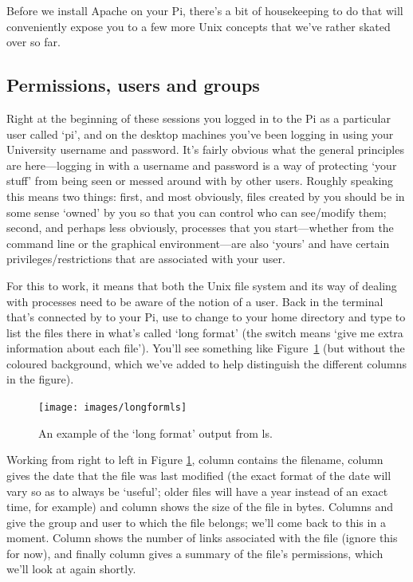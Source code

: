 Before we install Apache on your Pi, there's a bit of housekeeping to
do that will conveniently expose you to a few more Unix concepts that
we've rather skated over so far.

\subsection{Permissions, users and groups}

Right at the beginning of these sessions you logged in to the Pi as a
particular user called `pi', and on the desktop machines you've been
logging in using your University username and password. It's fairly
obvious what the general principles are here---logging in with a
username and password is a way of protecting `your stuff' from being
seen or messed around with by other users. Roughly speaking this means
two things: first, and most obviously, files created by you should be
in some sense `owned' by you so that you can control who can
see/modify them; second, and perhaps less obviously, processes that
you start---whether from the command line or the graphical
environment---are also `yours' and have certain
privileges/restrictions that are associated with your user.

For this to work, it means that both the Unix file system and its way
of dealing with processes need to be aware of the notion of a
user. Back in the terminal that's connected by  to your
Pi, use  to change to your home directory and type
 to list the files there in what's called `long
format' (the  switch means `give me extra information about
each file'). You'll see something like Figure~\ref{figure:longformls}
(but without the coloured background, which we've added to help
distinguish the different columns in the figure).

\begin{figure}
\centerline{\texttt{[image: images/longformls]}}
\caption{An example of the `long format' output from ls.}\label{figure:longformls}
\end{figure}

Working from right to left in Figure \ref{figure:longformls}, column
\protect{} contains the filename, column \protect{}
gives the date that the file was last modified (the exact format of
the date will vary so as to always be `useful'; older files will have
a year instead of an exact time, for example) and column
\protect{} shows the size of the file in bytes. Columns
\protect{} and \protect{} give the group and user to
which the file belongs; we'll come back to this in a moment. Column
\protect{} shows the number of links associated with the file
(ignore this for now), and finally column \protect{} gives a
summary of the file's permissions, which we'll look at again shortly.

